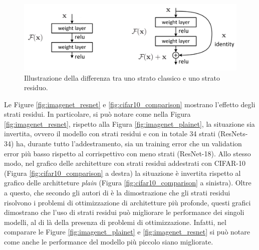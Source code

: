 


\begin{figure}[h!]
    \centering
    \hspace*{-0.1in}
    \includegraphics[scale=0.4]{img/residual_blocks.png}
    \caption{Illustrazione della differenza tra uno strato classico e uno strato residuo.}
    \label{fig:residual_block}
\end{figure}

Le Figure \ref{fig:imagenet_resnet} e \ref{fig:cifar10_comparison} mostrano l'effetto degli strati residui. In particolare, si può notare come nella Figura \ref{fig:imagenet_resnet}, rispetto alla Figura \ref{fig:imagenet_plainet}, la situazione sia invertita, ovvero il modello con strati residui e con in totale 34 strati (ResNets-34) ha, durante tutto l'addestramento, sia un training error che un validation error più basso rispetto al corrispettivo con meno strati (ResNet-18). Allo stesso modo, nel grafico delle architetture con strati residui addestrati con CIFAR-10 (Figura \ref{fig:cifar10_comparison} a destra) la situazione è invertita rispetto al grafico delle architteture \textit{plain} (Figura \ref{fig:cifar10_comparison} a sinistra). Oltre a questo, che secondo gli autori di \cite{resnets} è la dimostrazione che gli strati residui risolvono i problemi di ottimizzazione di architetture più profonde, questi grafici dimostrano che l'uso di strati residui può migliorare le performance dei singoli modelli, al di là della presenza di problemi di ottimizzazione. Infatti, nel comparare le Figure \ref{fig:imagenet_plainet} e \ref{fig:imagenet_resnet} si può notare come anche le performance del modello più piccolo siano migliorate.


